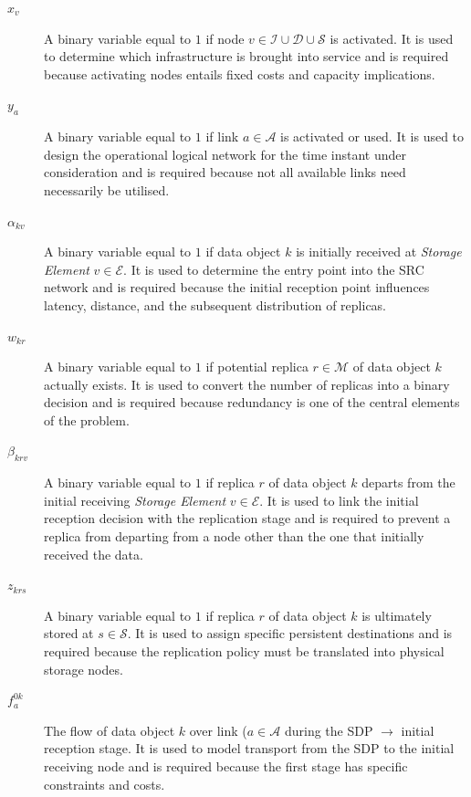\documentclass[a4paper,fleqn]{cas-dc}
\newcommand{\A}{\mathcal{A}}
\newcommand{\Iset}{\mathcal{I}}
\newcommand{\Dset}{\mathcal{D}}
\newcommand{\Eset}{\mathcal{E}}
\newcommand{\Sset}{\mathcal{S}}
\newcommand{\Mset}{\mathcal{M}}
\begin{document}
\begin{description}

\item[\(x_v\)] A binary variable equal to \(1\) if node \(v\in\Iset\cup\Dset\cup\Sset\) is activated. It is used to determine which infrastructure is brought into service and is required because activating nodes entails fixed costs and capacity implications. 

\item[\(y_a\)] A binary variable equal to \(1\) if link \(a\in\A\) is activated or used. It is used to design the operational logical network for the time instant under consideration and is required because not all available links need necessarily be utilised. 

\item[\(\alpha_{kv}\)] A binary variable equal to \(1\) if data object \(k\) is initially received at \emph{Storage Element} \(v\in\Eset\). It is used to determine the entry point into the SRC network and is required because the initial reception point influences latency, distance, and the subsequent distribution of replicas. 

\item[\(w_{kr}\)] A binary variable equal to \(1\) if potential replica \(r\in\Mset\) of data object \(k\) actually exists. It is used to convert the number of replicas into a binary decision and is required because redundancy is one of the central elements of the problem. 

\item[\(\beta_{krv}\)] A binary variable equal to \(1\) if replica \(r\) of data object \(k\) departs from the initial receiving \emph{Storage Element} \(v\in\Eset\). It is used to link the initial reception decision with the replication stage and is required to prevent a replica from departing from a node other than the one that initially received the data. 

\item[\(z_{krs}\)] A binary variable equal to \(1\) if replica \(r\) of data object \(k\) is ultimately stored at \(s\in\Sset\). It is used to assign specific persistent destinations and is required because the replication policy must be translated into physical storage nodes. 

\item[\(f_a^{0k}\)] The flow of data object \(k\) over link (\(a\in\A\) during the SDP \(\to\) initial reception stage. It is used to model transport from the SDP to the initial receiving node and is required because the first stage has specific constraints and costs. 


\end{description}
\end{document}
